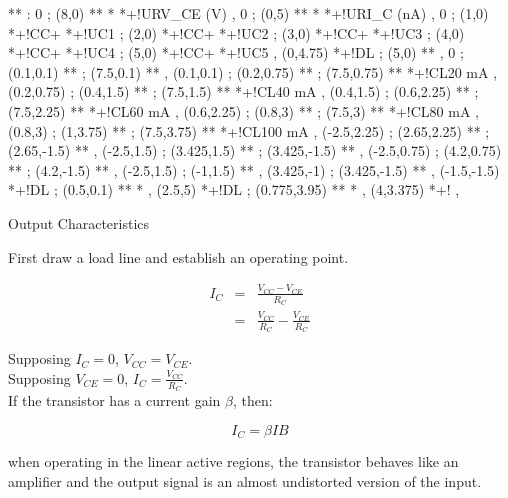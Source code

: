 \documentclass[a4paper,12pt]{article}
\begin{document}
\begin{table}[hbtp]

\vspace{10mm}
**\dir{--} 
\xy <1cm,0cm>:
0 ; (8,0) **\dir{-} *\dir{>} *+!UR{V_{CE} (V)} ,
0 ; (0,5) **\dir{-} *\dir{>} *+!UR{I_{C} (nA)} ,
0 ; (1,0) *+!CC{+} *+!UC{1} 
; (2,0) *+!CC{+} *+!UC{2}
; (3,0) *+!CC{+} *+!UC{3}
; (4,0) *+!CC{+} *+!UC{4}
; (5,0) *+!CC{+} *+!UC{5} ,
(0,4.75) *+!DL{} ; (5,0) **\dir{-} ,
0 ; (0.1,0.1) ** ; (7.5,0.1) **\dir{-} ,
(0.1,0.1) ; (0.2,0.75) ** ; (7.5,0.75) **\dir{-} *+!CL{20 mA} ,
(0.2,0.75) ; (0.4,1.5) ** ; (7.5,1.5) **\dir{-} *+!CL{40 mA} ,
(0.4,1.5) ; (0.6,2.25) ** ; (7.5,2.25) **\dir{-} *+!CL{60 mA} ,
(0.6,2.25) ; (0.8,3) ** ; (7.5,3) **\dir{-} *+!CL{80 mA} ,
(0.8,3) ; (1,3.75) ** ; (7.5,3.75) **\dir{-} *+!CL{100 mA} ,
%
(-2.5,2.25) ; (2.65,2.25) **\dir{--} ; (2.65,-1.5) **\dir{--} ,
(-2.5,1.5) ; (3.425,1.5) **\dir{--} ; (3.425,-1.5) **\dir{--} ,
(-2.5,0.75) ; (4.2,0.75) **\dir{--} ; (4.2,-1.5) **\dir{--} ,
%
(-2.5,1.5) ; (-1,1.5) ** ,
(3.425,-1) ; (3.425,-1.5) ** ,
(-1.5,-1.5) *+!DL ; (0.5,0.1) **\dir{-} *\dir{>} ,
(2.5,5) *+!DL ; (0.775,3.95) **\dir{-} *\dir{>} ,
(4,3.375) *+! ,
\endxy

\caption{Output Characteristics}

\end{table}

First draw a load line and establish an operating point.

\begin{eqnarray}
I_{C} & = & \frac{V_{CC} - V_{CE}}{R_{C}} \\
		& = & \frac{V_{CC}}{R_{C}} - \frac{V_{CE}}{R_{C}}
\end{eqnarray}

Supposing $I_{C} = 0$, $V_{CC} = V_{CE}$. \\

Supposing $V_{CE} = 0$, $I_{C} = \frac{V_{CC}}{R_{C}}$. \\

If the transistor has a current gain $\beta$, then:

\[ I_{C} = \beta I B \]

when operating in the linear active regions, the transistor
behaves like an amplifier and the output signal is an almost undistorted
version of the input.
\end{document}
